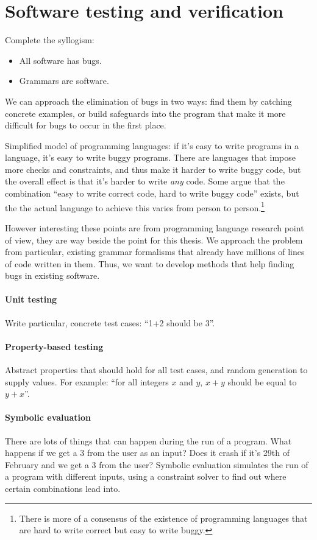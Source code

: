 \section{Software testing and verification}
\label{sec:testing-intro} 


Complete the syllogism:

\begin{itemize}
\item All software has bugs.
\item Grammars are software.
\end{itemize}
We can approach the elimination of bugs in two ways: find them by
catching concrete examples, or build safeguards into the program that
make it more difficult for bugs to occur in the first place.

Simplified model of programming languages: if it's easy to write
programs in a language, it's easy to write buggy programs. There are
languages that impose more checks and constraints, and thus make it
harder to write buggy code, but the overall effect is that it's harder
to write \emph{any} code. Some argue that the combination ``easy to
write correct code, hard to write buggy code'' exists, but the the
actual language to achieve this varies from person to
person.\footnote{There is more of a consensus of the existence of
programming languages that are hard to write correct but easy to write
buggy.} 

However interesting these points are from programming language
research point of view, they are way beside the point for this
thesis. We approach the problem from particular, existing grammar
formalisms that already have millions of lines of code written in
them. Thus, we want to develop methods that help finding bugs in
existing software. 


\paragraph{Unit testing}

Write particular, concrete test cases: ``1+2 should be 3''.

\paragraph{Property-based testing}

Abstract properties that should hold for all test cases, and random
generation to supply values. For example: ``for all integers $x$ and
$y$, $x+y$ should be equal to $y+x$''. 

\paragraph{Symbolic evaluation}

There are lots of things that can happen during the run of a
program. What happens if we get a 3 from the user as an input? Does it
crash if it's 29th of February and we get a 3 from the user?  Symbolic 
evaluation simulates the run of a program with different inputs, using 
a constraint solver to find out where certain combinations lead into.




